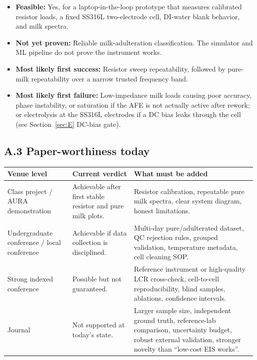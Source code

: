 \documentclass[11pt,a4paper]{article}
\begin{document}
\begin{itemize}
\item \textbf{Feasible:} Yes, for a laptop-in-the-loop prototype that measures calibrated resistor loads, a fixed SS316L two-electrode cell, DI-water blank behavior, and milk spectra.
\item \textbf{Not yet proven:} Reliable milk-adulteration classification. The simulator and ML pipeline do not prove the instrument works.
\item \textbf{Most likely first success:} Resistor sweep repeatability, followed by pure-milk repeatability over a narrow trusted frequency band.
\item \textbf{Most likely first failure:} Low-impedance milk loads causing poor accuracy, phase instability, or saturation if the AFE is not actually active after rework; or electrolysis at the SS316L electrodes if a DC bias leaks through the cell (see Section~\ref{sec:E} DC-bias gate).
\end{itemize}

\subsection{A.3 Paper-worthiness today}

\begin{xltabular}{\textwidth}{L{42mm}L{38mm}Y}
\toprule
\textbf{Venue level} & \textbf{Current verdict} & \textbf{What must be added}\\
\midrule
Class project / AURA demonstration &
Achievable after first stable resistor and pure milk plots. &
Resistor calibration, repeatable pure milk spectra, clear system diagram, honest limitations.\\
Undergraduate conference / local conference &
Achievable if data collection is disciplined. &
Multi-day pure/adulterated dataset, QC rejection rules, grouped validation, temperature metadata, cell cleaning SOP.\\
Strong indexed conference &
Possible but not guaranteed. &
Reference instrument or high-quality LCR cross-check, cell-to-cell reproducibility, blind samples, ablations, confidence intervals.\\
Journal &
Not supported at today's state. &
Larger sample size, independent ground truth, reference-lab comparison, uncertainty budget, robust external validation, stronger novelty than ``low-cost EIS works''.\\
\bottomrule
\end{xltabular}
\end{document}
